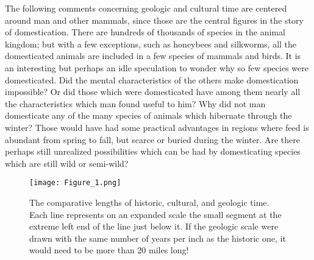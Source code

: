 The following comments concerning geologic and cultural time are centered around man and other mammals,
since those are the central figures in the story of domestication. There are hundreds of thousands of
species in the animal kingdom; but with a few exceptions, such as honeybees and silkworms, all the
domesticated animals are included in a few species of mammals and birds. It is an interesting but perhaps
an idle speculation to wonder why so few species were domesticated. Did the mental characteristics of the
others make domestication impossible? Or did those which were domesticated have among them nearly all the
characteristics which man found useful to him? Why did not man domesticate any of the many species of animals
which hibernate through the winter? Those would have had some practical advantages in regions where feed is abundant from spring to
fall, but scarce or buried during the winter. Are there perhaps still unrealized possibilities which can be had
by domesticating species which are still wild or semi-wild?

\begin{figure}[htbp]
    \texttt{[image: Figure\_1.png]}
    \caption{The comparative lengths of historic, cultural, and geologic time. Each line represents on an expanded scale the small segment at the extreme left end of the line just below it. If the geologic scale were drawn with the same number of years per inch as the historic one, it would need to be more than 20 miles long!}
    \label{fig:Lush_Figure_1}
\end{figure}

